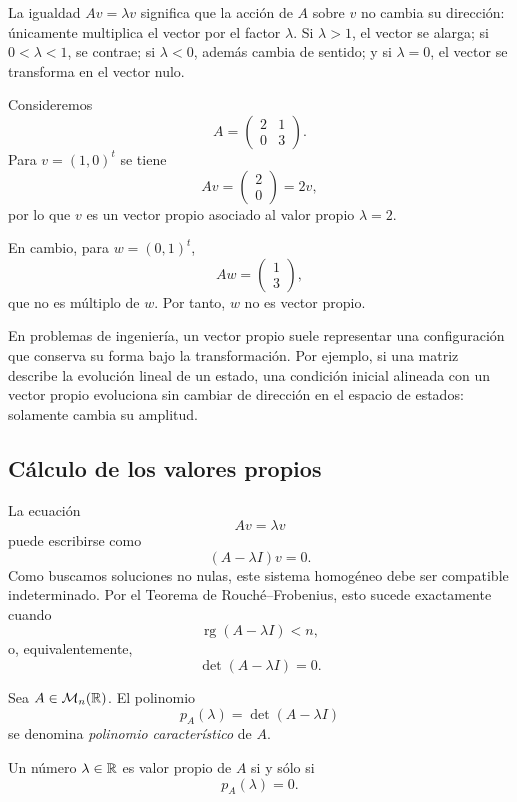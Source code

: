 La igualdad $Av=\lambda v$ significa que la acción de $A$ sobre $v$ no cambia su dirección: únicamente multiplica el vector por el factor $\lambda$. Si $\lambda>1$, el vector se alarga; si $0<\lambda<1$, se contrae; si $\lambda<0$, además cambia de sentido; y si $\lambda=0$, el vector se transforma en el vector nulo.

\begin{example}
Consideremos
\[
A=\begin{pmatrix}
2&1\\
0&3
\end{pmatrix}.
\]
Para $v=(1,0)^t$ se tiene
\[
Av=\begin{pmatrix}2\\0\end{pmatrix}=2v,
\]
por lo que $v$ es un vector propio asociado al valor propio $\lambda=2$.

En cambio, para $w=(0,1)^t$,
\[
Aw=\begin{pmatrix}1\\3\end{pmatrix},
\]
que no es múltiplo de $w$. Por tanto, $w$ no es vector propio.
\end{example}

En problemas de ingeniería, un vector propio suele representar una configuración que conserva su forma bajo la transformación. Por ejemplo, si una matriz describe la evolución lineal de un estado, una condición inicial alineada con un vector propio evoluciona sin cambiar de dirección en el espacio de estados: solamente cambia su amplitud.

\subsection{Cálculo de los valores propios}

La ecuación
\[
Av=\lambda v
\]
puede escribirse como
\[
(A-\lambda I)v=0.
\]
Como buscamos soluciones no nulas, este sistema homogéneo debe ser compatible indeterminado. Por el Teorema de Rouché--Frobenius, esto sucede exactamente cuando
\[
\operatorname{rg}(A-\lambda I)<n,
\]
o, equivalentemente,
\[
\det(A-\lambda I)=0.
\]

\begin{definition}
Sea $A\in\mathcal M_n(\mathbb{R})$. El polinomio
\[
p_A(\lambda)=\det(A-\lambda I)
\]
se denomina \emph{polinomio característico} de $A$.
\end{definition}

\begin{theorem}
Un número $\lambda\in\mathbb{R}$ es valor propio de $A$ si y sólo si
\[
p_A(\lambda)=0.
\]
\end{theorem}

